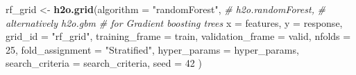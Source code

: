 \documentclass[]{article}
\newenvironment{Shaded}{\begin{snugshade}}{\end{snugshade}}
\newcommand{\KeywordTok}[1]{\textcolor[rgb]{0.13,0.29,0.53}{\textbf{{#1}}}}
\newcommand{\DataTypeTok}[1]{\textcolor[rgb]{0.13,0.29,0.53}{{#1}}}
\newcommand{\DecValTok}[1]{\textcolor[rgb]{0.00,0.00,0.81}{{#1}}}
\newcommand{\StringTok}[1]{\textcolor[rgb]{0.31,0.60,0.02}{{#1}}}
\newcommand{\CommentTok}[1]{\textcolor[rgb]{0.56,0.35,0.01}{\textit{{#1}}}}
\newcommand{\NormalTok}[1]{{#1}}
\begin{document}
\begin{Shaded}
\begin{Highlighting}[]
\NormalTok{rf_grid <-}\StringTok{ }\KeywordTok{h2o.grid}\NormalTok{(}\DataTypeTok{algorithm =} \StringTok{"randomForest"}\NormalTok{, }\CommentTok{# h2o.randomForest, }
                                                \CommentTok{# alternatively h2o.gbm }
                                                \CommentTok{# for Gradient boosting trees}
                    \DataTypeTok{x =} \NormalTok{features,}
                    \DataTypeTok{y =} \NormalTok{response,}
                    \DataTypeTok{grid_id =} \StringTok{"rf_grid"}\NormalTok{,}
                    \DataTypeTok{training_frame =} \NormalTok{train,}
                    \DataTypeTok{validation_frame =} \NormalTok{valid,}
                    \DataTypeTok{nfolds =} \DecValTok{25}\NormalTok{,                           }
                    \DataTypeTok{fold_assignment =} \StringTok{"Stratified"}\NormalTok{,}
                    \DataTypeTok{hyper_params =} \NormalTok{hyper_params,}
                    \DataTypeTok{search_criteria =} \NormalTok{search_criteria,}
                    \DataTypeTok{seed =} \DecValTok{42}
                    \NormalTok{)}
\end{Highlighting}
\end{Shaded}
\end{document}
